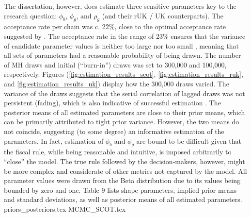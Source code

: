 The dissertation, however, does estimate three sensitive parameters key to the research question: $\phi_b$, $\phi_g$, and $\rho_g$ (and their rUK / UK counterparts). The acceptance rate per chain was c. 22\%, close to the optimal acceptance rate suggested by \textcite{roberts_2001_optimal}. The acceptance rate in the range of 23\% ensures that the variance of candidate parameter values is neither too large nor too small \parencite{roberts_2001_optimal}, meaning that all sets of parameters had a reasonable probability of being drawn. The number of MH draws and initial (``burn-in'') draws was set to 300,000 and 100,000, respectively. Figures (\ref{fig:estimation_results_scot}, \ref{fig:estimation_results_ruk}, and \ref{fig:estimation_results_uk}) display how the 300,000 draws varied. The variance of the draws suggests that the serial correlation of lagged draws was not persistent (fading), which is also indicative of successful estimation \parencite{roberts_2001_optimal}. The posterior means of all estimated parameters are close to their prior means, which can be primarily attributed to tight prior variance. However, the two means do not coincide, suggesting (to some degree) an informative estimation of the parameters. In fact, estimation of $\phi_b$ and $\phi_g$ are bound to be difficult given that the fiscal rule, while being reasonable and intuitive, is imposed arbitrarily to ``close'' the model. The true rule followed by the decision-makers, however, might be more complex and considerate of other metrics not captured by the model. All parameter values were drawn from the Beta distribution due to its values being bounded by zero and one. Table 9 lists shape parameters, implied prior means and standard deviations, as well as posterior means of all estimated parameters. 
{priors_posteriors.tex}
{MCMC_SCOT.tex}
